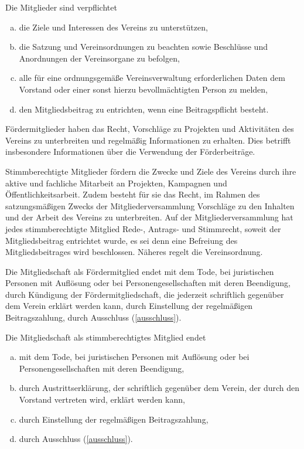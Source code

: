 \begin{contract}
    Die Mitglieder sind verpflichtet
    \begin{enumerate}[(a)]
        \item die Ziele und Interessen des Vereins zu unterstützen,
        \item die Satzung und Vereinsordnungen zu beachten sowie Beschlüsse und Anordnungen der Vereinsorgane zu befolgen,
        \item alle für eine ordnungsgemäße Vereinsverwaltung erforderlichen Daten dem Vorstand oder einer sonst hierzu bevollmächtigten Person zu melden,
        \item den Mitgliedsbeitrag zu entrichten, wenn eine Beitragspflicht besteht.
    \end{enumerate}

    Fördermitglieder haben das Recht, Vorschläge zu Projekten und Aktivitäten des Vereins zu unterbreiten und regelmäßig Informationen zu erhalten. Dies betrifft insbesondere Informationen über die Verwendung der Förderbeiträge.

    Stimmberechtigte Mitglieder fördern die Zwecke und Ziele des Vereins durch ihre aktive und fachliche Mitarbeit an Projekten, Kampagnen und Öffentlichkeitsarbeit. Zudem besteht für sie das Recht, im Rahmen des satzungsmäßigen Zwecks der Mitgliederversammlung Vorschläge zu den Inhalten und der Arbeit des Vereins zu unterbreiten. Auf der Mitgliederversammlung hat jedes stimmberechtigte Mitglied Rede-, Antrags- und Stimmrecht, soweit der Mitgliedsbeitrag entrichtet wurde, es sei denn eine Befreiung des Mitgliedsbeitrages wird beschlossen. Näheres regelt die Vereinsordnung.


    Die Mitgliedschaft als Fördermitglied endet
    mit dem Tode, bei juristischen Personen mit Auflösung oder bei Personengesellschaften mit deren Beendigung,
    durch Kündigung der Fördermitgliedschaft, die jederzeit schriftlich gegenüber dem Verein erklärt werden kann,
    durch Einstellung der regelmäßigen Beitragszahlung,
    durch Ausschluss (\ref{ausschluss}).

    Die Mitgliedschaft als stimmberechtigtes Mitglied endet
    \begin{enumerate}[(a)]
        \item mit dem Tode, bei juristischen Personen mit Auflösung oder bei Personengesellschaften mit deren Beendigung,
        \item durch Austrittserklärung, der schriftlich gegenüber dem Verein, der durch den Vorstand vertreten wird, erklärt werden kann,
        \item durch Einstellung der regelmäßigen Beitragszahlung,
        \item durch Ausschluss (\ref{ausschluss}).
    \end{enumerate}


\end{contract}
